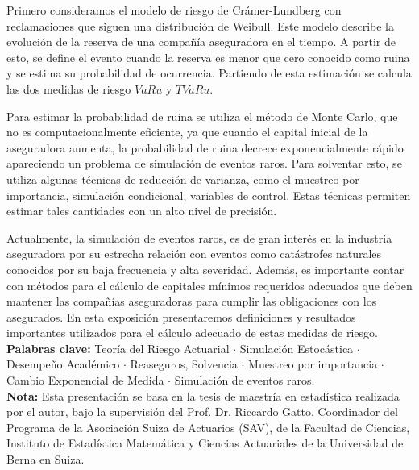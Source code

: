\documentclass[a5paper,doc,10pt,noapacite]{apa6}
\newcommand{\pto}{$\cdot$ }
\begin{document}
{{Primero consideramos el modelo de riesgo de Crámer-Lundberg con reclamaciones que siguen una distribución de Weibull. Este modelo describe la evolución de la reserva de una compañía aseguradora en el tiempo. A partir de esto, se define el evento cuando la reserva es menor que cero conocido como ruina y se estima su probabilidad de ocurrencia. Partiendo de esta estimación se calcula las dos medidas de riesgo \(VaRu\) y \(TVaRu\).

Para estimar la probabilidad de ruina se utiliza el método de Monte Carlo, que no es computacionalmente eficiente, ya que cuando el capital inicial de la aseguradora aumenta, la probabilidad de ruina decrece exponencialmente rápido apareciendo un problema de simulación de eventos raros. Para solventar esto, se utiliza algunas técnicas de reducción de varianza, como el muestreo por importancia, simulación condicional, variables de control. Estas técnicas permiten estimar tales cantidades con un alto nivel de precisión.

Actualmente, la simulación de eventos raros, es de gran interés en la industria aseguradora por su estrecha relación con  eventos como catástrofes naturales conocidos por su baja frecuencia y alta severidad. Además, es importante contar con métodos para el cálculo de capitales mínimos requeridos adecuados que deben mantener las compañías aseguradoras para cumplir las obligaciones con los asegurados.
En esta exposición presentaremos definiciones y resultados importantes utilizados para el cálculo adecuado de estas medidas de riesgo.\\

	\scriptsize \textbf{Palabras clave:} Teoría del Riesgo Actuarial \pto Simulación Estocástica \pto Desempeño Académico \pto Reaseguros, Solvencia \pto Muestreo por importancia \pto Cambio Exponencial de Medida \pto Simulación de eventos raros.\\
	
	\scriptsize \textbf{Nota:} Esta presentación se basa en la tesis de maestría en estadística realizada por el autor, bajo la supervisión del Prof. Dr. Riccardo Gatto. Coordinador del Programa de la Asociación Suiza de Actuarios (SAV), de la Facultad de Ciencias, Instituto de Estadística Matemática y Ciencias Actuariales de la Universidad de Berna en Suiza.
}


\vfill
\newpage


}
\end{document}
